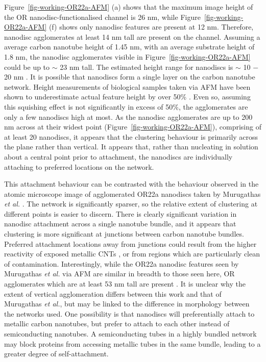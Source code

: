 \documentclass[
  a4paper,
]{scrbook}
\begin{document}
Figure~\ref{fig-working-OR22a-AFM} (a) shows that the maximum image
height of the OR nanodisc-functionalised channel is 26 nm, while
Figure~\ref{fig-working-OR22a-AFM} (f) shows only nanodisc features are
present at 12 nm. Therefore, nanodisc agglomerates at least 14 nm tall
are present on the channel. Assuming a average carbon nanotube height of
1.45 nm, with an average substrate height of 1.8 nm, the nanodisc
agglomerates visible in Figure~\ref{fig-working-OR22a-AFM} could be up
to \(\sim\) 23 nm tall. The estimated height range for nanodiscs is
\(\sim\) 10 \(-\) 20 nm
\autocite{Nath2007,Bayburt2010,Murugathas2020,Cheema2021}. It is
possible that nanodiscs form a single layer on the carbon nanotube
network. Height measurements of biological samples taken via AFM have
been shown to underestimate actual feature height by over 50\%
\autocite{Vobornik2023}. Even so, assuming this squishing effect is not
significantly in excess of 50\%, the agglomerates are only a few
nanodiscs high at most. As the nanodisc agglomerates are up to 200 nm
across at their widest point (Figure~\ref{fig-working-OR22a-AFM}),
comprising of at least 20 nanodiscs, it appears that the clustering
behaviour is primarily across the plane rather than vertical. It appears
that, rather than nucleating in solution about a central point prior to
attachment, the nanodiscs are individually attaching to preferred
locations on the network.

This attachment behaviour can be contrasted with the behaviour observed
in the atomic microscope image of agglomerated OR22a nanodiscs taken by
Murugathas \emph{et al.} \autocite{Murugathas2019a}. The network is
significantly sparser, so the relative extent of clustering at different
points is easier to discern. There is clearly significant variation in
nanodisc attachment across a single nanotube bundle, and it appears that
clustering is more significant at junctions between carbon nanotube
bundles. Preferred attachment locations away from junctions could result
from the higher reactivity of exposed metallic CNTs \autocite{Cao2009},
or from regions which are particularly clean of contamination.
Interestingly, while the OR22a nanodisc features seen by Murugathas
\emph{et al.} via AFM are similar in breadth to those seen here, OR
agglomerates which are at least 53 nm tall are present
\autocite{Murugathas2020}. It is unclear why the extent of vertical
agglomeration differs between this work and that of Murugathas \emph{et
al.}, but may be linked to the difference in morphology between the
networks used. One possibility is that nanodiscs will preferentially
attach to metallic carbon nanotubes, but prefer to attach to each other
instead of semiconducting nanotubes. A semiconducting tubes in a highly
bundled network may block proteins from accessing metallic tubes in the
same bundle, leading to a greater degree of self-attachment.
\end{document}
